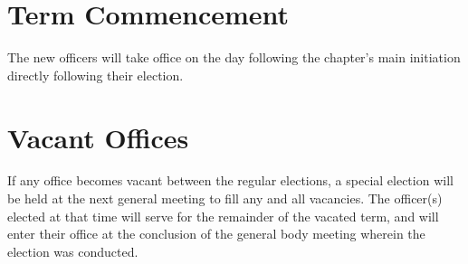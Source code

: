  
\section{Term Commencement} The new officers will take office on the day following the chapter's main initiation directly following their election.
\section{Vacant Offices} If any office becomes vacant between the regular elections, a special election will be held at the next general meeting to fill any and all vacancies. The officer(s) elected at that time will serve for the remainder of the vacated term, and will enter their office at the conclusion of the general body meeting wherein the election was conducted. %